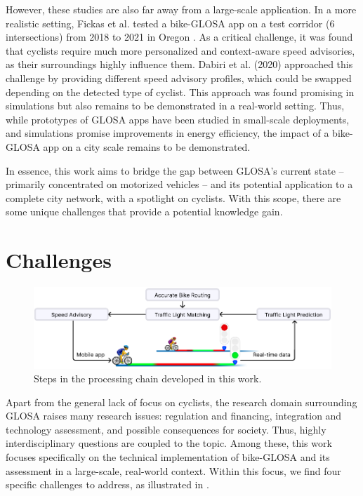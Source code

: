 However, these studies are also far away from a large-scale application. In a more realistic setting, Fickas et al. tested a bike-GLOSA app on a test corridor (6 intersections) from 2018 to 2021 in Oregon \cite{fickas_project_2018, fickas_riding_2019, fickas_fast_2019, fickas_green_2021, fickas_using_2021, fickas_data_2021}. As a critical challenge, it was found that cyclists require much more personalized and context-aware speed advisories, as their surroundings highly influence them. Dabiri et al. (2020) \cite{dabiri_optimized_2020} approached this challenge by providing different speed advisory profiles, which could be swapped depending on the detected type of cyclist. This approach was found promising in simulations but also remains to be demonstrated in a real-world setting. Thus, while prototypes of GLOSA apps have been studied in small-scale deployments, and simulations promise improvements in energy efficiency, the impact of a bike-GLOSA app on a city scale remains to be demonstrated.

In essence, this work aims to bridge the gap between GLOSA's current state -- primarily concentrated on motorized vehicles -- and its potential application to a complete city network, with a spotlight on cyclists. With this scope, there are some unique challenges that provide a potential knowledge gain.

\section{Challenges}

\begin{figure}
\centering
\includegraphics[width=\linewidth]{images/outline.pdf}
\caption{Steps in the processing chain developed in this work.}
\label{fig:outline}
\end{figure}

Apart from the general lack of focus on cyclists, the research domain surrounding GLOSA raises many research issues: regulation and financing, integration and technology assessment, and possible consequences for society. Thus, highly interdisciplinary questions are coupled to the topic. Among these, this work focuses specifically on the technical implementation of bike-GLOSA and its assessment in a large-scale, real-world context. Within this focus, we find four specific challenges to address, as illustrated in .

